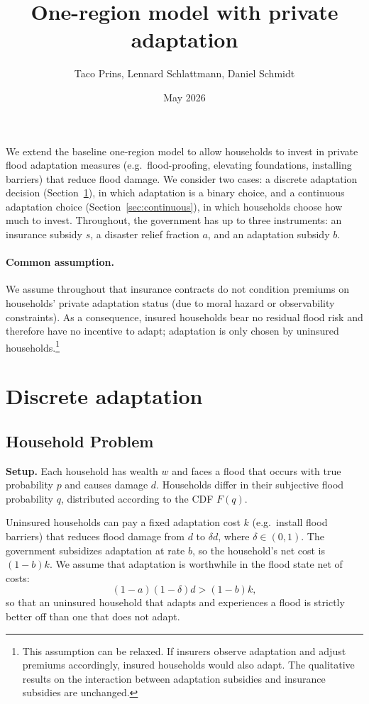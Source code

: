 \documentclass{article}
\title{One-region model with private adaptation}
\author{Taco Prins, Lennard Schlattmann, Daniel Schmidt}
\date{May 2026}
\begin{document}
\maketitle

We extend the baseline one-region model to allow households to invest in private flood adaptation measures (e.g.\ flood-proofing, elevating foundations, installing barriers) that reduce flood damage. We consider two cases: a discrete adaptation decision (Section~\ref{sec:discrete}), in which adaptation is a binary choice, and a continuous adaptation choice (Section~\ref{sec:continuous}), in which households choose how much to invest. Throughout, the government has up to three instruments: an insurance subsidy $s$, a disaster relief fraction $a$, and an adaptation subsidy $b$.

\paragraph{Common assumption.} We assume throughout that insurance contracts do not condition premiums on households' private adaptation status (due to moral hazard or observability constraints). As a consequence, insured households bear no residual flood risk and therefore have no incentive to adapt; adaptation is only chosen by uninsured households.\footnote{This assumption can be relaxed. If insurers observe adaptation and adjust premiums accordingly, insured households would also adapt. The qualitative results on the interaction between adaptation subsidies and insurance subsidies are unchanged.}

\section{Discrete adaptation}
\label{sec:discrete}

\subsection{Household Problem}

\textbf{Setup.} Each household has wealth $w$ and faces a flood that occurs with true probability $p$ and causes damage $d$. Households differ in their subjective flood probability $q$, distributed according to the CDF $F(q)$.

Uninsured households can pay a fixed adaptation cost $k$ (e.g.\ install flood barriers) that reduces flood damage from $d$ to $\delta d$, where $\delta\in(0,1)$. The government subsidizes adaptation at rate $b$, so the household's net cost is $(1-b)k$. We assume that adaptation is worthwhile in the flood state net of costs:
\begin{equation}
    (1-a)(1-\delta)d > (1-b)k, \label{eq:adaptation_worthwhile}
\end{equation}
so that an uninsured household that adapts and experiences a flood is strictly better off than one that does not adapt.
\end{document}
